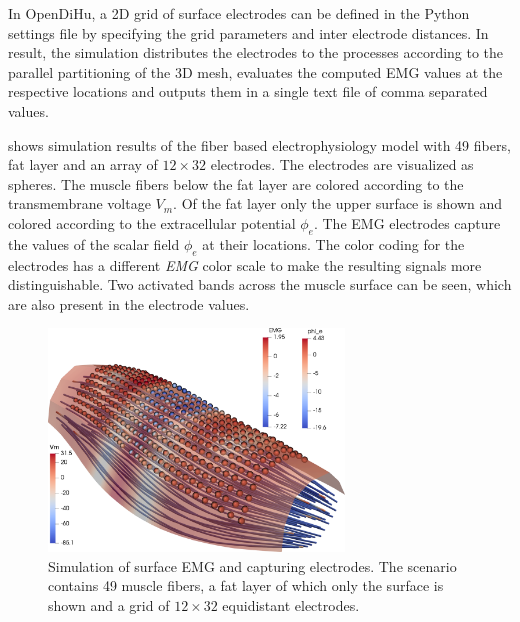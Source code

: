 In OpenDiHu, a 2D grid of surface electrodes can be defined in the Python settings file by specifying the grid parameters and inter electrode distances. In result, the simulation distributes the electrodes to the processes according to the parallel partitioning of the 3D mesh, evaluates the computed EMG values at the respective locations and outputs them in a single text file of comma separated values.

 shows simulation results of the fiber based electrophysiology model with 49 fibers, fat layer and an array of $12\times 32$ electrodes. The electrodes are visualized as spheres. The muscle fibers below the fat layer are colored according to the transmembrane voltage $V_m$. Of the fat layer only the upper surface is shown and colored according to the extracellular potential $\phi_e$. The EMG electrodes capture the values of the scalar field $\phi_e$ at their locations. The color coding for the electrodes has a different \emph{EMG} color scale to make the resulting signals more distinguishable. Two activated bands across the muscle surface can be seen, which are also present in the electrode values.

\begin{figure}
  \centering%
  \includegraphics[width=0.7\textwidth]{images/results/application/fibers_fat_emg2.png}%
  \caption{Simulation of surface EMG and capturing electrodes. The scenario contains 49 muscle fibers, a fat layer of which only the surface is shown and a grid of $12 \times 32$ equidistant electrodes.}%
  \label{fig:fibers_fat_emg2_electrodes}%
\end{figure}

